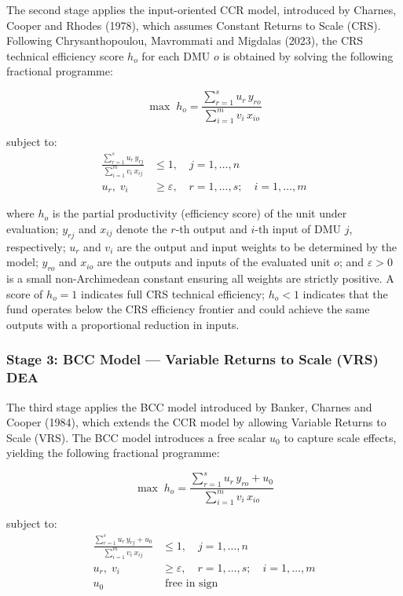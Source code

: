 \documentclass[12pt,a4paper]{article}
\begin{document}
The second stage applies the input-oriented CCR model, introduced by Charnes, Cooper and Rhodes (1978), which assumes Constant Returns to Scale (CRS). Following Chrysanthopoulou, Mavrommati and Migdalas (2023), the CRS technical efficiency score $h_o$ for each DMU $o$ is obtained by solving the following fractional programme:

\begin{equation}
\max \; h_o = \frac{\displaystyle\sum_{r=1}^{s} u_r \, y_{ro}}{\displaystyle\sum_{i=1}^{m} v_i \, x_{io}}
\end{equation}

subject to:
\begin{align}
\frac{\displaystyle\sum_{r=1}^{s} u_r \, y_{rj}}{\displaystyle\sum_{i=1}^{m} v_i \, x_{ij}} &\leq 1, \quad j = 1, \ldots, n \\[6pt]
u_r,\; v_i &\geq \varepsilon, \quad r = 1, \ldots, s; \quad i = 1, \ldots, m
\end{align}

where $h_o$ is the partial productivity (efficiency score) of the unit under evaluation; $y_{rj}$ and $x_{ij}$ denote the $r$-th output and $i$-th input of DMU $j$, respectively; $u_r$ and $v_i$ are the output and input weights to be determined by the model; $y_{ro}$ and $x_{io}$ are the outputs and inputs of the evaluated unit $o$; and $\varepsilon > 0$ is a small non-Archimedean constant ensuring all weights are strictly positive. A score of $h_o = 1$ indicates full CRS technical efficiency; $h_o < 1$ indicates that the fund operates below the CRS efficiency frontier and could achieve the same outputs with a proportional reduction in inputs.

\subsubsection{Stage 3: BCC Model --- Variable Returns to Scale (VRS) DEA}

The third stage applies the BCC model introduced by Banker, Charnes and Cooper (1984), which extends the CCR model by allowing Variable Returns to Scale (VRS). The BCC model introduces a free scalar $u_0$ to capture scale effects, yielding the following fractional programme:

\begin{equation}
\max \; h_o = \frac{\displaystyle\sum_{r=1}^{s} u_r \, y_{ro} + u_0}{\displaystyle\sum_{i=1}^{m} v_i \, x_{io}}
\end{equation}

subject to:
\begin{align}
\frac{\displaystyle\sum_{r=1}^{s} u_r \, y_{rj} + u_0}{\displaystyle\sum_{i=1}^{m} v_i \, x_{ij}} &\leq 1, \quad j = 1, \ldots, n \\[6pt]
u_r,\; v_i &\geq \varepsilon, \quad r = 1, \ldots, s; \quad i = 1, \ldots, m \\[6pt]
u_0 &\;\text{free in sign}
\end{align}
\end{document}
